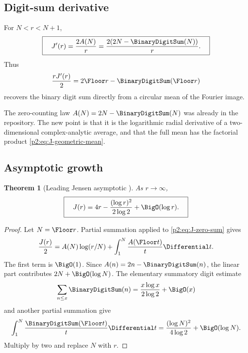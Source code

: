 \documentclass[11pt]{article}
\newtheorem{theorem}{Theorem}[section]
\theoremstyle{definition}
\theoremstyle{remark}
\begin{document}
\subsection{Digit-sum derivative}

\begin{corollary}
For $N<r<N+1$,
\begin{equation}
 \boxed{\quad
 J'(r)=\frac{2A(N)}r
 =\frac{2(2N-\BinaryDigitSum(N))}{r}.
 \quad}                                                  \label{p2:eq:J-derivative}
\end{equation}
Thus
\begin{equation}
 \frac{rJ'(r)}2=2\Floor r-\BinaryDigitSum(\Floor r)                  \label{p2:eq:J-digit-recovery}
\end{equation}
recovers the binary digit sum directly from a circular mean of the Fourier image.
\end{corollary}

\begin{remark}
The zero-counting law $A(N)=2N-\BinaryDigitSum(N)$ was already in the repository.  The new point is that
it is the logarithmic radial derivative of a two-dimensional complex-analytic average, and
that the full mean has the factorial product \eqref{p2:eq:J-geometric-mean}.
\end{remark}

\subsection{Asymptotic growth}

\begin{theorem}[Leading Jensen asymptotic \New]
As $r\to\infty$,
\begin{equation}
 \boxed{\quad
 J(r)=4r-\frac{(\log r)^2}{2\log2}+\BigO(\log r).
 \quad}                                                  \label{p2:eq:J-asymptotic}
\end{equation}
\end{theorem}

\begin{proof}
Let $N=\Floor r$.  Partial summation applied to \eqref{p2:eq:J-zero-sum} gives
\[
 \frac{J(r)}2=A(N)\log(r/N)
 +\int_1^N\frac{A(\Floor t)}{t}\Differential t.
\]
The first term is $\BigO(1)$.  Since
$A(n)=2n-\BinaryDigitSum(n)$, the linear part contributes $2N+\BigO(\log N)$.  The elementary
summatory digit estimate
\[
 \sum_{n\le x}\BinaryDigitSum(n)=\frac{x\log x}{2\log2}+\BigO(x)
\]
and another partial summation give
\[
 \int_1^N\frac{\BinaryDigitSum(\Floor t)}{t}\Differential t
 =\frac{(\log N)^2}{4\log2}+\BigO(\log N).
\]
Multiply by two and replace $N$ with $r$.
\end{proof}
\end{document}
